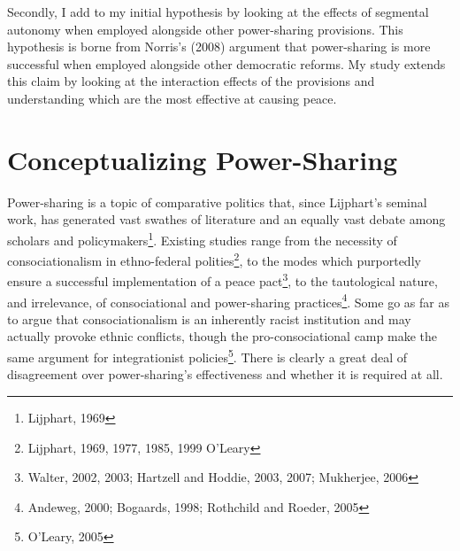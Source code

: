 \documentclass[12pt]{article}
\begin{document}
Secondly, I add to my initial hypothesis by looking at the effects of segmental autonomy when employed alongside other power-sharing provisions. This hypothesis is borne from Norris’s (2008) argument that power-sharing is more successful when employed alongside other democratic reforms. My study extends this claim by looking at the interaction effects of the provisions and understanding which are the most effective at causing peace.

\section{Conceptualizing Power-Sharing} 
Power-sharing is a topic of comparative politics that, since Lijphart’s seminal work, has generated vast swathes of literature and an equally vast debate among scholars and policymakers\footnote{Lijphart, 1969}. Existing studies range from the necessity of consociationalism in ethno-federal polities\footnote{Lijphart, 1969, 1977, 1985, 1999 O’Leary}, to the modes which purportedly ensure a successful implementation of a peace pact\footnote{Walter, 2002, 2003; Hartzell and Hoddie, 2003, 2007; Mukherjee, 2006}, to the tautological nature, and irrelevance, of consociational and power-sharing practices\footnote{Andeweg, 2000; Bogaards, 1998; Rothchild and Roeder, 2005}. Some go as far as to argue that consociationalism is an inherently racist institution and may actually provoke ethnic conflicts, though the pro-consociational camp make the same argument for integrationist policies\footnote{O’Leary, 2005}. There is clearly a great deal of disagreement over power-sharing’s effectiveness and whether it is required at all. 
\end{document}
